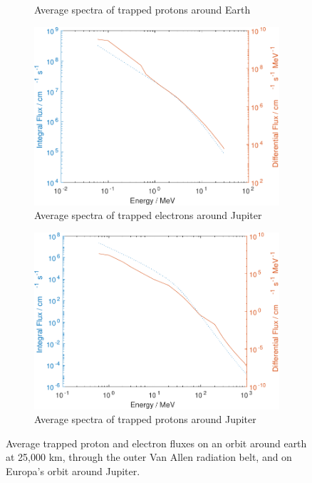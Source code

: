 \begin{figure}[htb]
\begin{subfigure}[b]{0.49\textwidth}
         \caption{Average spectra of trapped protons around Earth}
         \label{fig:trappedprotonsEarth}
     \end{subfigure}
     \hfill
     \begin{subfigure}[b]{0.49\textwidth}
         \centering
         \includegraphics[width=\textwidth]{Media/J_Electron_Flux}
         \caption{Average spectra of trapped electrons around Jupiter}
         \label{fig:trappedelectronsJupiter}
     \end{subfigure}
     \hfill
     \begin{subfigure}[b]{0.49\textwidth}
         \centering
         \includegraphics[width=\textwidth]{Media/J_Proton_Flux}
         \caption{Average spectra of trapped protons around Jupiter}
         \label{fig:trappedprotonsJupiter}
     \end{subfigure}
     \caption{Average trapped proton and electron fluxes on an orbit around earth at 25,000 km, through the outer Van Allen radiation belt, and on Europa's orbit around Jupiter.}
     \label{fig:trappedprotonelectronfluxes}
\end{figure}

